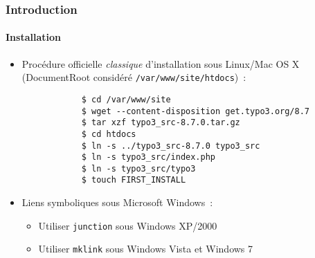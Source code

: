 \begin{frame}[fragile]
	\frametitle{Introduction}
	\framesubtitle{Installation}

	\begin{itemize}
		\item Procédure officielle \textit{classique} d'installation sous Linux/Mac OS X\newline
			(DocumentRoot considéré \texttt{/var/www/site/htdocs})~:
		\begin{lstlisting}
			$ cd /var/www/site
			$ wget --content-disposition get.typo3.org/8.7
			$ tar xzf typo3_src-8.7.0.tar.gz
			$ cd htdocs
			$ ln -s ../typo3_src-8.7.0 typo3_src
			$ ln -s typo3_src/index.php
			$ ln -s typo3_src/typo3
			$ touch FIRST_INSTALL
		\end{lstlisting}

		\item Liens symboliques sous Microsoft Windows~:

			\begin{itemize}
				\item Utiliser \texttt{junction} sous Windows XP/2000
				\item Utiliser \texttt{mklink} sous Windows Vista et Windows 7
			\end{itemize}

	\end{itemize}
\end{frame}

